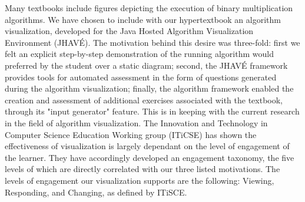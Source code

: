 \documentclass{acm_proc_article-sp}
\begin{document}
Many textbooks include figures depicting the execution of binary multiplication algorithms.
We have chosen to include with our hypertextbook an algorithm visualization, developed for the Java Hosted Algorithm Visualization Environment (JHAVÉ).
The motivation behind this desire was three-fold: first we felt an explicit step-by-step demonstration of the running algorithm would preferred by the student over a static diagram; second, the JHAVÉ framework provides tools for automated assessment in the form of questions generated during the algorithm visualization; finally, the algorithm framework enabled the creation and assessment of additional exercises associated with the textbook, through its "input generator" feature.
This is in keeping with the current research in the field of algorithm visualization\cite{needsCitation}.
The Innovation and Technology in Computer Science Education Working group (ITiCSE) has shown the effectiveness of visualization is largely dependant on the level of engagement of the learner\cite{needsCitation}.
They have accordingly developed an engagement taxonomy, the five levels of which are directly correlated with our three listed motivations.
The levels of engagement our visualization supports are the following: Viewing, Responding, and Changing, as defined by ITiSCE.

\balancecolumns
\end{document}
